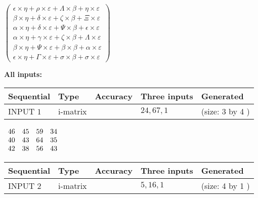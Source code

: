 \documentclass[12pt]{article}
\begin{document}
   
 $  \left( \begin{array}
 {
 c
 }
  \epsilon \times  \eta +  \rho \times  \varepsilon +  \Lambda \times  \beta +  \eta \times  \varepsilon \\ 
  \beta \times  \eta +  \delta \times  \varepsilon +                     \zeta \times  \beta +                     \Xi \times  \varepsilon \\ 
  \alpha \times  \eta +  \delta \times  \varepsilon +  \Psi \times  \beta +  \epsilon \times  \varepsilon \\ 
  \alpha \times  \eta +  \gamma \times  \varepsilon +                     \zeta \times  \beta +  \Lambda \times  \varepsilon \\ 
  \beta \times  \eta +  \Psi \times  \varepsilon +  \beta \times  \beta +  \alpha \times  \varepsilon \\ 
  \epsilon \times  \eta +  \Gamma \times  \varepsilon +  \sigma \times  \beta +  \sigma \times  \varepsilon
 \end{array} \right) $ 
   
   
\noindent\vspace{0.1in}\hspace{-0.08in} {\textbf{\Large{All inputs: }}}
   
   
  
  
\noindent\begin{tabular}{|l|l|l|l|l|}
\hline
 Sequential & Type & Accuracy & Three inputs & Generated \\ 
\hline
 
 
  INPUT $            1 $ & i-matrix &  & $
 24
 , 
 67
 , 
 1
 $ & (size:            3  by            4 )
 \\  \hline  
 \end{tabular}
   
   
 $\begin{array}{
 c
 c
 c
 c
 }
          46  & 
          45  & 
          59  & 
          34  \\ 
          40  & 
          43  & 
          64  & 
          35  \\ 
          42  & 
          38  & 
          56  & 
          43
\end{array}  $ 
  
  
\noindent\begin{tabular}{|l|l|l|l|l|}
\hline
 Sequential & Type & Accuracy & Three inputs & Generated \\ 
\hline
 
 
  INPUT $            2 $ & i-matrix &  & $
 5
 , 
 16
 , 
 1
 $ & (size:            4  by            1 )
 \\  \hline  
 \end{tabular}
   
\end{document}

